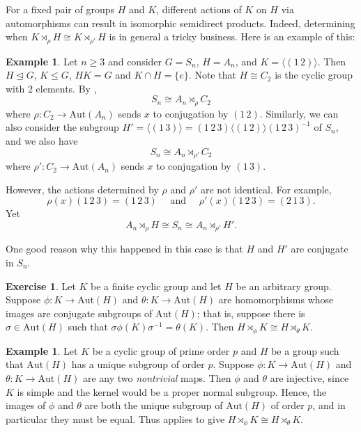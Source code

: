 \documentclass[12pt]{report}
\numberwithin{equation}{section}
\numberwithin{theorem}{chapter}
\theoremstyle{definition}
\newtheorem{example}[theorem]{Example}
\newtheorem{exercise}{Exercise}
\newtheorem*{basic properties}{Basic Properties}
\newtheorem*{Important Remark}{Important Remark}
\def\sdp{\rtimes}
\begin{document}
For a fixed pair of groups $H$ and $K$, different actions of $K$ on $H$ via automorphisms can result in isomorphic semidirect products. Indeed, determining when $K \sdp_{\rho} H \cong K \sdp_{\rho'} H$ is in general a tricky business. Here is an example of this:

\begin{example}
Let $n \geqslant 3$ and consider $G = S_n$, $H = A_n$, and $K = \langle (1 \, 2) \rangle$. Then $H \trianglelefteq G$, $K \leq G$, $HK = G$ and $K \cap H  = \{e\}$. Note that $H \cong C_2$ is the cyclic group with $2$ elements. 
By ,
$$S_n \cong A_n \sdp_\rho C_2$$
where $\rho\!: C_2 \longrightarrow \mathrm{Aut}(A_n)$ sends $x$ to conjugation by $(1 \, 2)$. 
Similarly, we can also consider the subgroup $H' = \langle (1 \, 3) \rangle = (1 \,2 \, 3) \langle (1 \, 2) \rangle (1 \,2 \, 3)^{-1}$ of $S_n$, and we also have
$$S_n \cong A_n \sdp_{\rho'} C_2$$
where $\rho': C_2 \to \mathrm{Aut}(A_n)$ sends $x$ to conjugation by $(1 \,3)$.

However, the actions determined by $\rho$ and $\rho'$ are not identical. For example, 
$$\rho(x)(1 \, 2 \, 3) = (1 \, 2 \, 3) \quad \text{ and } \quad \rho'(x)(1 \, 2 \, 3 ) = (2 \, 1 \, 3).$$
Yet 
$$A_n \sdp_{\rho} H \cong S_n \cong A_n \sdp_{\rho'} H'.$$
\end{example}

One good reason why this happened in this case is that $H$ and $H'$ are conjugate in $S_n$.



\begin{exercise}\label{semidirect product iso if conjugate}
Let $K$ be a finite cyclic group and let $H$ be an arbitrary group. Suppose $\phi\!: K \to \mathrm{Aut}(H)$ and $\theta\!: K \to \mathrm{Aut}(H)$ are homomorphisms whose images are conjugate subgroups of $\mathrm{Aut}(H)$; that is, suppose there is $\sigma \in \mathrm{Aut}(H)$ such that $\sigma \phi(K) \sigma^{-1} = \theta(K)$. Then $H \sdp_\phi K \cong H \sdp_\theta K$. 
\end{exercise}


\begin{example}
Let $K$ be a cyclic group of prime order $p$ and $H$ be a group such that $\mathrm{Aut}(H)$ has a unique subgroup of order $p$. Suppose $\phi\!: K \to \mathrm{Aut}(H)$ and $\theta\!: K \to \mathrm{Aut}(H)$ are any two {\em nontrivial} maps. Then $\phi$ and $\theta$ are injective, since $K$ is simple and the kernel would be a proper normal subgroup. Hence, the images of $\phi$ and $\theta$ are both the unique subgroup of $\mathrm{Aut}(H)$ of order $p$, and in particular they must be equal. Thus  applies to give $H \sdp_\phi K \cong H \sdp_\theta K$.
\end{example}
\end{document}
